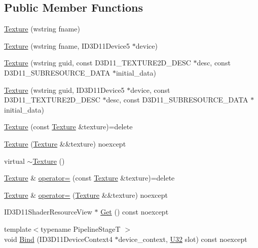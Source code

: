 \subsection*{Public Member Functions}
\begin{DoxyCompactItemize}
\item 
\hyperlink{classmage_1_1_texture_a235e56cd6a3886daf11b0caa1d568da9}{Texture} (wstring fname)
\item 
\hyperlink{classmage_1_1_texture_a83ac38f0e0c8b1a1c8a0c9b04312eb21}{Texture} (wstring fname, I\+D3\+D11\+Device5 $\ast$device)
\item 
\hyperlink{classmage_1_1_texture_a661fb85e24d261be573fd5358e88759c}{Texture} (wstring guid, const D3\+D11\+\_\+\+T\+E\+X\+T\+U\+R\+E2\+D\+\_\+\+D\+E\+SC $\ast$desc, const D3\+D11\+\_\+\+S\+U\+B\+R\+E\+S\+O\+U\+R\+C\+E\+\_\+\+D\+A\+TA $\ast$initial\+\_\+data)
\item 
\hyperlink{classmage_1_1_texture_adea078acfd56421756dd2ad311e4649b}{Texture} (wstring guid, I\+D3\+D11\+Device5 $\ast$device, const D3\+D11\+\_\+\+T\+E\+X\+T\+U\+R\+E2\+D\+\_\+\+D\+E\+SC $\ast$desc, const D3\+D11\+\_\+\+S\+U\+B\+R\+E\+S\+O\+U\+R\+C\+E\+\_\+\+D\+A\+TA $\ast$initial\+\_\+data)
\item 
\hyperlink{classmage_1_1_texture_aed9e8ab5bc3efdeb381672fd4e243ea7}{Texture} (const \hyperlink{classmage_1_1_texture}{Texture} \&texture)=delete
\item 
\hyperlink{classmage_1_1_texture_a78a58499a8849c7dc163ed3fcb7a05cb}{Texture} (\hyperlink{classmage_1_1_texture}{Texture} \&\&texture) noexcept
\item 
virtual \hyperlink{classmage_1_1_texture_a431f772cd37c75fd35f8f696c103238d}{$\sim$\+Texture} ()
\item 
\hyperlink{classmage_1_1_texture}{Texture} \& \hyperlink{classmage_1_1_texture_a0b73b4df98d729c8f60e58b0ca065636}{operator=} (const \hyperlink{classmage_1_1_texture}{Texture} \&texture)=delete
\item 
\hyperlink{classmage_1_1_texture}{Texture} \& \hyperlink{classmage_1_1_texture_acb6194e969cc928f21ecef1d863d1b9b}{operator=} (\hyperlink{classmage_1_1_texture}{Texture} \&\&texture) noexcept
\item 
I\+D3\+D11\+Shader\+Resource\+View $\ast$ \hyperlink{classmage_1_1_texture_ac48cd0477d9771666e3929d72ee4e419}{Get} () const noexcept
\item 
{\footnotesize template$<$typename Pipeline\+StageT $>$ }\\void \hyperlink{classmage_1_1_texture_a3e26e9f6a1f4113e3c9fe39759012f61}{Bind} (I\+D3\+D11\+Device\+Context4 $\ast$device\+\_\+context, \hyperlink{namespacemage_a41c104c036fba3756a74e19f793eeaa1}{U32} slot) const noexcept
\end{DoxyCompactItemize}
